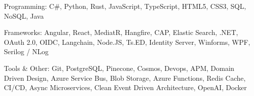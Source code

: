 \vspace{-1\baselineskip}
\begin{cvskills}
  \cvskill
    {Programming:} %
    {C\#, Python, Rust, JavaScript, TypeScript, HTML5, CSS3, SQL, NoSQL, Java} %

  \cvskill
    {Frameworks:} %
    {Angular, React, MediatR, Hangfire, CAP, Elastic Search, .NET, OAuth 2.0, OIDC, Langchain, Node.JS, Ts.ED, Identity Server, Winforms, WPF, Serilog / NLog} %

  \cvskill
    {Tools \& Other:} %
    {Git, PostgreSQL, Pinecone, Cosmos, Devops, APM, Domain Driven Design, Azure Service Bus, Blob Storage, Azure Functions, Redis Cache, CI/CD, Async Microservices, Clean Event Driven Architecture, OpenAI, Docker} %

\end{cvskills}
\vspace{-0.5\baselineskip}